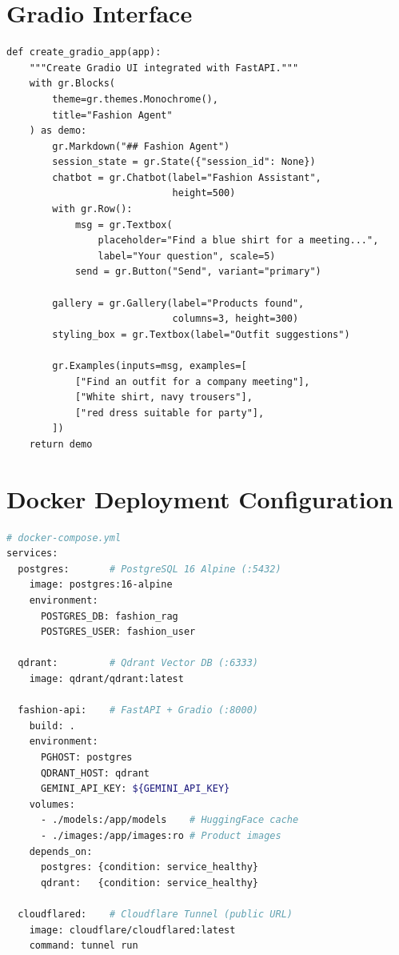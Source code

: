 \section{Gradio Interface}

\begin{lstlisting}[caption={Gradio Chat Interface --- api/main.py}]
def create_gradio_app(app):
    """Create Gradio UI integrated with FastAPI."""
    with gr.Blocks(
        theme=gr.themes.Monochrome(),
        title="Fashion Agent"
    ) as demo:
        gr.Markdown("## Fashion Agent")
        session_state = gr.State({"session_id": None})
        chatbot = gr.Chatbot(label="Fashion Assistant",
                             height=500)
        with gr.Row():
            msg = gr.Textbox(
                placeholder="Find a blue shirt for a meeting...",
                label="Your question", scale=5)
            send = gr.Button("Send", variant="primary")

        gallery = gr.Gallery(label="Products found",
                             columns=3, height=300)
        styling_box = gr.Textbox(label="Outfit suggestions")

        gr.Examples(inputs=msg, examples=[
            ["Find an outfit for a company meeting"],
            ["White shirt, navy trousers"],
            ["red dress suitable for party"],
        ])
    return demo
\end{lstlisting}

\section{Docker Deployment Configuration}

\begin{lstlisting}[language=bash,caption={Docker Compose --- 4 services}]
# docker-compose.yml
services:
  postgres:       # PostgreSQL 16 Alpine (:5432)
    image: postgres:16-alpine
    environment:
      POSTGRES_DB: fashion_rag
      POSTGRES_USER: fashion_user

  qdrant:         # Qdrant Vector DB (:6333)
    image: qdrant/qdrant:latest

  fashion-api:    # FastAPI + Gradio (:8000)
    build: .
    environment:
      PGHOST: postgres
      QDRANT_HOST: qdrant
      GEMINI_API_KEY: ${GEMINI_API_KEY}
    volumes:
      - ./models:/app/models    # HuggingFace cache
      - ./images:/app/images:ro # Product images
    depends_on:
      postgres: {condition: service_healthy}
      qdrant:   {condition: service_healthy}

  cloudflared:    # Cloudflare Tunnel (public URL)
    image: cloudflare/cloudflared:latest
    command: tunnel run
\end{lstlisting}

